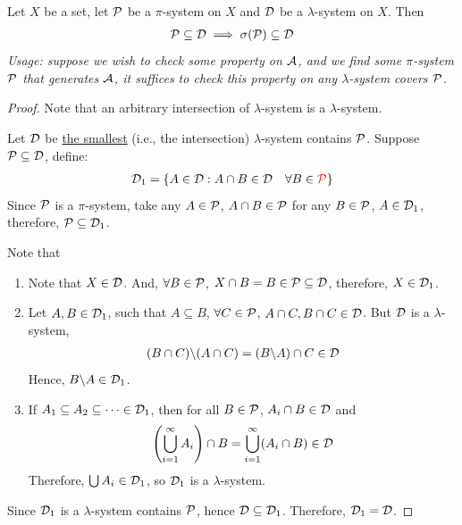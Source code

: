 \documentclass[11pt]{article}
\begin{document}
	\begin{theorem}
		Let $X$ be a set, let $\mathcal{{P}}$ be a $\pi$-system on $X$ and $\mathcal{{D}}$ be a $\lambda$-system on $X$. Then
		\begin{align}
			\mathcal{{P}} \subseteq \mathcal{{D}} \implies \sigma(\mathcal{{P}}) \subseteq \mathcal{{D}}
		\end{align}
		\emph{Usage: suppose we wish to check some property on $\mathcal{{A}}$, and we find some $\pi$-system $\mathcal{{P}}$ that generates $\mathcal{{A}}$, it suffices to check this property on any $\lambda$-system covers $\mathcal{{P}}$.}
		\begin{proof}
			Note that an arbitrary intersection of $\lambda$-system is a $\lambda$-system.
			
			Let $\mathcal{{D}}$ be \ul{the smallest} (i.e., the intersection) $\lambda$-system contains $\mathcal{{P}}$.
			Suppose $\mathcal{{P}} \subseteq \mathcal{{D}}$,
			define:
			\begin{align}
				\mathcal{{D}}_1 = \{A \in \mathcal{{D}} : A \cap B \in \mathcal{{D}}\quad \forall B \in \textcolor{red}{\mathcal{{P}}}\}
			\end{align}
			Since $\mathcal{{P}}$ is a $\pi$-system, take any $A \in \mathcal{{P}}$, $A \cap B \in \mathcal{{P}}$ for any $B \in \mathcal{{P}}$, $A \in \mathcal{{D}}_1$, therefore, $\mathcal{{P}} \subseteq \mathcal{{D}}_1$.
			
			Note that
			\begin{enumerate}
				\item Note that $X \in \mathcal{{D}}$. And, $\forall B \in \mathcal{{P}}$, $X \cap B = B \in \mathcal{{P}} \subseteq \mathcal{{D}}$, therefore, $X \in \mathcal{{D}}_1$.
				\item Let $A, B \in \mathcal{{D}}_1$, such that $A \subseteq B$, $\forall C \in \mathcal{{P}}$, $A \cap C, B \cap C \in \mathcal{{D}}$.
				But $\mathcal{{D}}$ is a $\lambda$-system, 
				\begin{align}
					(B \cap C) \backslash (A \cap C) = (B \backslash A) \cap C \in \mathcal{{D}}
				\end{align}
				Hence, $B \backslash A \in \mathcal{{D}}_1$.
				\item If $A_1 \subseteq A_2 \subseteq \dots \in \mathcal{{D}}_1$, then for all $B \in \mathcal{{P}}$, $A_i \cap B \in \mathcal{{D}}$ and
				\begin{align}
					\left(\bigcup_{i=1}^\infty A_i\right) \cap B = \bigcup_{i=1}^\infty (A_i \cap B) \in \mathcal{{D}} \label{eq:5}
				\end{align}
				Therefore, $\bigcup A_i \in \mathcal{{D}}_1$, so $\mathcal{{D}}_1$ is a $\lambda$-system.
			\end{enumerate}
			Since $\mathcal{{D}}_1$ is a $\lambda$-system contains $\mathcal{{P}}$, hence $\mathcal{{D}} \subseteq \mathcal{{D}}_1$. Therefore, $\mathcal{{D}}_1 = \mathcal{{D}}$.
			

\end{proof}
\end{theorem}
\end{document}
